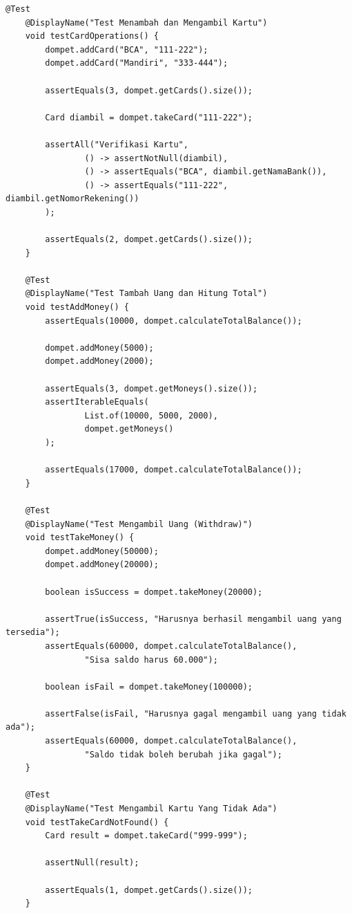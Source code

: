 \documentclass[a4paper,12pt]{article}
\begin{document}
\begin{lstlisting}[style=javastyle]
    @Test
    @DisplayName("Test Menambah dan Mengambil Kartu")
    void testCardOperations() {
        dompet.addCard("BCA", "111-222");
        dompet.addCard("Mandiri", "333-444");

        assertEquals(3, dompet.getCards().size());

        Card diambil = dompet.takeCard("111-222");

        assertAll("Verifikasi Kartu",
                () -> assertNotNull(diambil),
                () -> assertEquals("BCA", diambil.getNamaBank()),
                () -> assertEquals("111-222", diambil.getNomorRekening())
        );

        assertEquals(2, dompet.getCards().size());
    }

    @Test
    @DisplayName("Test Tambah Uang dan Hitung Total")
    void testAddMoney() {
        assertEquals(10000, dompet.calculateTotalBalance());

        dompet.addMoney(5000);
        dompet.addMoney(2000);

        assertEquals(3, dompet.getMoneys().size());
        assertIterableEquals(
                List.of(10000, 5000, 2000),
                dompet.getMoneys()
        );

        assertEquals(17000, dompet.calculateTotalBalance());
    }

    @Test
    @DisplayName("Test Mengambil Uang (Withdraw)")
    void testTakeMoney() {
        dompet.addMoney(50000);
        dompet.addMoney(20000);

        boolean isSuccess = dompet.takeMoney(20000);

        assertTrue(isSuccess, "Harusnya berhasil mengambil uang yang tersedia");
        assertEquals(60000, dompet.calculateTotalBalance(),
                "Sisa saldo harus 60.000");

        boolean isFail = dompet.takeMoney(100000);

        assertFalse(isFail, "Harusnya gagal mengambil uang yang tidak ada");
        assertEquals(60000, dompet.calculateTotalBalance(),
                "Saldo tidak boleh berubah jika gagal");
    }

    @Test
    @DisplayName("Test Mengambil Kartu Yang Tidak Ada")
    void testTakeCardNotFound() {
        Card result = dompet.takeCard("999-999");

        assertNull(result);

        assertEquals(1, dompet.getCards().size());
    }


\end{lstlisting}
\end{document}
